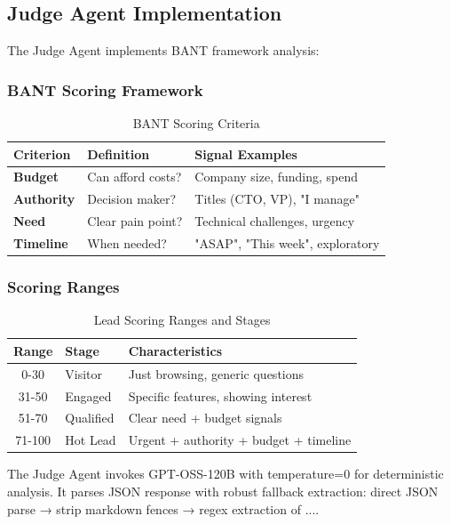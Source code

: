 \documentclass[10pt,twocolumn,a4paper]{article}
\begin{document}
\subsection{Judge Agent Implementation}

The Judge Agent implements BANT framework analysis:

\subsubsection{BANT Scoring Framework}

\begin{table}[H]
\centering
\small
\begin{tabular}{|l|l|l|}
\hline
\textbf{Criterion} & \textbf{Definition} & \textbf{Signal Examples} \\
\hline
\textbf{Budget} & Can afford costs? & Company size, funding, spend \\
\textbf{Authority} & Decision maker? & Titles (CTO, VP), "I manage" \\
\textbf{Need} & Clear pain point? & Technical challenges, urgency \\
\textbf{Timeline} & When needed? & "ASAP", "This week", exploratory \\
\hline
\end{tabular}
\caption{BANT Scoring Criteria}
\label{tab:bant}
\end{table}

\subsubsection{Scoring Ranges}

\begin{table}[H]
\centering
\small
\begin{tabular}{|c|l|p{}|}
\hline
\textbf{Range} & \textbf{Stage} & \textbf{Characteristics} \\
\hline
0-30 & Visitor & Just browsing, generic questions \\
31-50 & Engaged & Specific features, showing interest \\
51-70 & Qualified & Clear need + budget signals \\
71-100 & Hot Lead & Urgent + authority + budget + timeline \\
\hline
\end{tabular}
\caption{Lead Scoring Ranges and Stages}
\label{tab:scoring}
\end{table}

The Judge Agent invokes GPT-OSS-120B with temperature=0 for deterministic analysis. It parses JSON response with robust fallback extraction: direct JSON parse → strip markdown fences → regex extraction of {...}.
\end{document}
